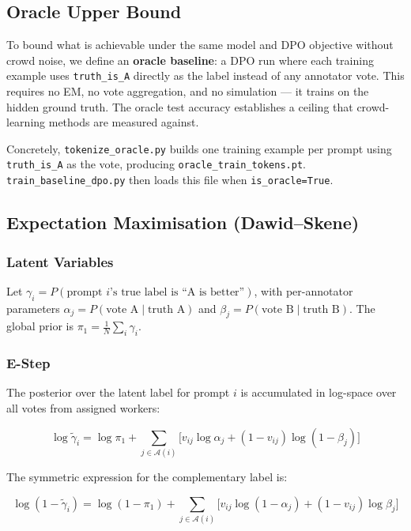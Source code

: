 \documentclass[11pt, a4paper]{article}
\begin{document}
\subsection{Oracle Upper Bound}

To bound what is achievable under the same model and DPO objective without crowd noise,
we define an \textbf{oracle baseline}: a DPO run where each training example uses
\texttt{truth\_is\_A} directly as the label instead of any annotator vote. This requires
no EM, no vote aggregation, and no simulation --- it trains on the hidden ground truth.
The oracle test accuracy establishes a ceiling that crowd-learning methods are measured
against.

Concretely, \texttt{tokenize\_oracle.py} builds one training example per prompt using
\texttt{truth\_is\_A} as the vote, producing \texttt{oracle\_train\_tokens.pt}.
\texttt{train\_baseline\_dpo.py} then loads this file when \texttt{is\_oracle=True}.

\subsection{Expectation Maximisation (Dawid--Skene)}

\subsubsection{Latent Variables}

Let $\gamma_i = P(\text{prompt } i \text{'s true label is ``A is better''})$, with
per-annotator parameters $\alpha_j = P(\text{vote A} \mid \text{truth A})$ and
$\beta_j = P(\text{vote B} \mid \text{truth B})$. The global prior is
$\pi_1 = \frac{1}{N}\sum_i \gamma_i$.

\subsubsection{E-Step}

The posterior over the latent label for prompt $i$ is accumulated in log-space over
all votes from assigned workers:

\[
  \log \tilde{\gamma}_i = \log \pi_1
    + \sum_{j \in \mathcal{A}(i)} \bigl[v_{ij}\log\alpha_j + (1-v_{ij})\log(1-\beta_j)\bigr]
\]

The symmetric expression for the complementary label is:

\[
  \log(1-\tilde{\gamma}_i) = \log(1-\pi_1)
    + \sum_{j \in \mathcal{A}(i)} \bigl[v_{ij}\log(1-\alpha_j) + (1-v_{ij})\log\beta_j\bigr]
\]
\end{document}
